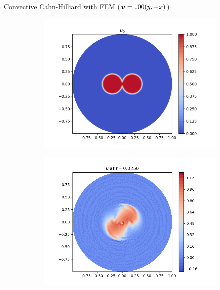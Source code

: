 \begin{frame}{Convective Cahn-Hilliard with FEM {\small($\boldsymbol{v}=100(y,-x)$)}}
	\vspace{-0.3cm}
	\begin{figure}[t]
		\begin{subfigure}{0.49\textwidth}
			\centering
			\includegraphics[scale=0.28]{img/convective-cahn-hilliard/u0.png}
		\end{subfigure}
		\hspace*{-1.5cm}
		\begin{subfigure}{0.49\textwidth}
			\centering
			\includegraphics[scale=0.28]{img/convective-cahn-hilliard/u_FE+Eyre_nt-100_t-0.02500_P1_adv-100.0_nx-50.png}
		\end{subfigure}

\end{figure}
\end{frame}
